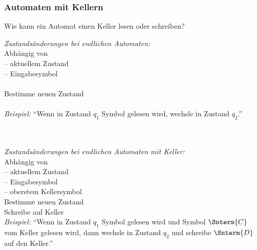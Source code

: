 \documentclass[aspectratio=1610,onlymath]{beamer}
\begin{document}
\begin{frame}\frametitle{Automaten mit Kellern}

\alert{Wie kann ein Automat einen Keller lesen oder schreiben?}
\pause\bigskip

\begin{minipage}{4.2cm}\begin{flushleft}
\emph{Zustandsänderungen bei endlichen Automaten:}\\[1ex]
% 
Abhängig von\\
-- aktuellem Zustand\\
-- Eingabesymbol\\
~\\[1ex]
% 
Bestimme neuen Zustand\\
~\\[1ex]
%
\emph{Beispiel:} "`Wenn in Zustand $q_1$ Symbol  gelesen wird, 
wechsle in Zustand $q_2$."'\\
~\\~
\end{flushleft}\end{minipage}\hspace{15mm}\pause%
\begin{minipage}{5.1cm}\begin{flushleft}
\emph{Zustandsänderungen bei endlichen Automaten mit Keller:}\\[1ex]
% 
Abhängig von\\
-- aktuellem Zustand\\
-- Eingabesymbol\\
-- oberstem Kellersymbol\\[1ex]
% 
Bestimme neuen Zustand\\
Schreibe auf Keller\\[1ex]
%
\emph{Beispiel:} "`Wenn in Zustand $q_1$ Symbol  gelesen wird und Symbol $\Snterm{C}$
vom Keller gelesen wird, dann
wechsle in Zustand $q_2$ und schreibe $\Snterm{D}$ auf den Keller."'
\end{flushleft}\end{minipage}

\end{frame}
\end{document}
